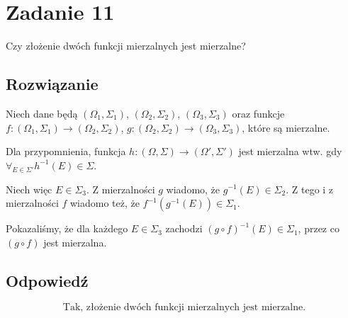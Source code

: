 \section{Zadanie 11}
Czy złożenie dwóch funkcji mierzalnych jest mierzalne?

\subsection*{Rozwiązanie}
Niech dane będą \((\Omega_1, \Sigma_1)\), \((\Omega_2, \Sigma_2)\), \((\Omega_3, \Sigma_3)\) oraz funkcje \(f: (\Omega_1, \Sigma_1) \xrightarrow{} (\Omega_2, \Sigma_2)\), \(g: (\Omega_2, \Sigma_2) \xrightarrow{} (\Omega_3, \Sigma_3)\), które są mierzalne.

Dla przypomnienia, funkcja \(h: (\Omega, \Sigma) \xrightarrow{} (\Omega', \Sigma')\) jest mierzalna wtw. gdy \(\forall_{E\in\Sigma'}  h^{-1}(E) \in \Sigma\).

Niech więc \(E \in \Sigma_3\). Z mierzalności \(g\) wiadomo, że \(g^{-1}(E) \in \Sigma_2\). Z tego i z mierzalności \(f\) wiadomo też, że \(f^{-1}(g^{-1}(E)) \in \Sigma_1\).

Pokazaliśmy, że dla każdego \(E \in \Sigma_3\) zachodzi \((g \circ f)^{-1}(E) \in \Sigma_1\), przez co \((g \circ f)\) jest mierzalna.

\subsection*{Odpowiedź}
\[
	\boxed{\text{Tak, złożenie dwóch funkcji mierzalnych jest mierzalne.}}
\]
